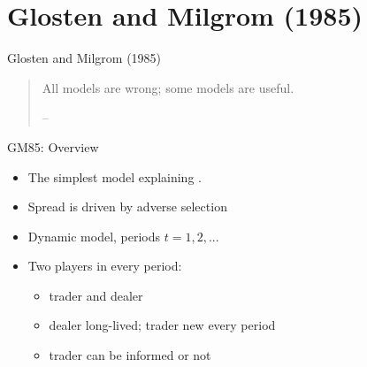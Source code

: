 \section{Glosten and Milgrom (1985)}

\begin{frame}{Glosten and Milgrom (1985)}
	\begin{quotation}
		All models are wrong; some models are useful.
		\begin{flushright}
			-- 
		\end{flushright}
	\end{quotation}
\end{frame}


\begin{frame}{GM85: Overview}
	\begin{itemize}
		\item The simplest model explaining .
		\item Spread is driven by adverse selection
		\item Dynamic model, periods $t = 1,2,...$
		\item Two players in every period:
		\begin{itemize}
			\item trader and dealer
			\item dealer long-lived; trader new every period
			\item trader can be informed or not
		\end{itemize}
	\end{itemize}
\end{frame}




